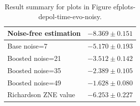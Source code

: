 \begin{table}
\caption{Result summary for plots in Figure 
ef{plots-depol-time-evo-noisy}.}
\begin{tabular*}{\textwidth}{@{\extracolsep{\fill}}ll@{}}
\toprule

Noise-free estimation & $-8.369 \pm 0.151$ \\
\midrule
Base noise=7 & $-5.170 \pm 0.193$ \\
Boosted noise=21 & $-3.512 \pm 0.142$ \\
Boosted noise=35 & $-2.389 \pm 0.105$ \\
Boosted noise=49 & $-1.628 \pm 0.080$ \\
\midrule
Richardson ZNE value & $-6.253 \pm 0.227$ \\
\bottomrule
\end{tabular*}
\label{table-dephasing-time-evo-noisy}
\end{table}
